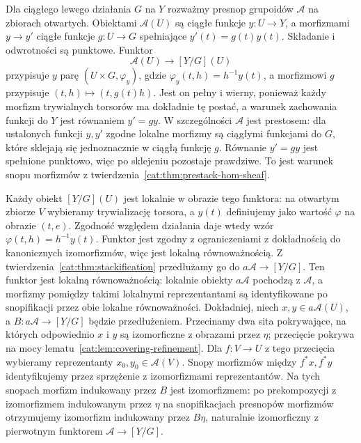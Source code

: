 \begin{przyklad}\label{cat:ex:quotient-stackification}
Dla ciągłego lewego działania $G$ na $Y$ rozważmy presnop grupoidów $\mathcal A$ na zbiorach otwartych. Obiektami $\mathcal A(U)$ są ciągłe funkcje $y:U\to Y$, a morfizmami $y\to y'$ ciągłe funkcje $g:U\to G$ spełniające $y'(t)=g(t)y(t)$. Składanie i odwrotności są punktowe. Funktor
\[
 \mathcal A(U)\longrightarrow [Y/G](U)
\]
przypisuje $y$ parę $(U\times G,\varphi_y)$, gdzie $\varphi_y(t,h)=h^{-1}y(t)$, a morfizmowi $g$ przypisuje $(t,h)\mapsto(t,g(t)h)$. Jest on pełny i wierny, ponieważ każdy morfizm trywialnych torsorów ma dokładnie tę postać, a warunek zachowania funkcji do $Y$ jest równaniem $y'=gy$. W szczególności $\mathcal A$ jest prestosem: dla ustalonych funkcji $y,y'$ zgodne lokalne morfizmy są ciągłymi funkcjami do $G$, które sklejają się jednoznacznie w ciągłą funkcję $g$. Równanie $y'=gy$ jest spełnione punktowo, więc po sklejeniu pozostaje prawdziwe. To jest warunek snopu morfizmów z twierdzenia~\ref{cat:thm:prestack-hom-sheaf}.

Każdy obiekt $[Y/G](U)$ jest lokalnie w obrazie tego funktora: na otwartym zbiorze $V$ wybieramy trywializację torsora, a $y(t)$ definiujemy jako wartość $\varphi$ na obrazie $(t,e)$. Zgodność względem działania daje wtedy wzór $\varphi(t,h)=h^{-1}y(t)$. Funktor jest zgodny z ograniczeniami z dokładnością do kanonicznych izomorfizmów, więc jest lokalną równoważnością. Z twierdzenia~\ref{cat:thm:stackification} przedłużamy go do $a\mathcal A\to[Y/G]$. Ten funktor jest lokalną równoważnością: lokalnie obiekty $a\mathcal A$ pochodzą z $\mathcal A$, a morfizmy pomiędzy takimi lokalnymi reprezentantami są identyfikowane po snopifikacji przez obie lokalne równoważności. Dokładniej, niech $x,y\in a\mathcal A(U)$, a $B:a\mathcal A\to[Y/G]$ będzie przedłużeniem. Przecinamy dwa sita pokrywające, na których odpowiednio $x$ i $y$ są izomorficzne z obrazami przez $\eta$; przecięcie pokrywa na mocy lematu~\ref{cat:lem:covering-refinement}. Dla $f:V\to U$ z tego przecięcia wybieramy reprezentanty $x_0,y_0\in\mathcal A(V)$. Snopy morfizmów między $f^*x,f^*y$ identyfikujemy przez sprzężenie z izomorfizmami reprezentantów. Na tych snopach morfizm indukowany przez $B$ jest izomorfizmem: po prekompozycji z izomorfizmem indukowanym przez $\eta$ na snopifikacjach presnopów morfizmów otrzymujemy izomorfizm indukowany przez $B\eta$, naturalnie izomorficzny z pierwotnym funktorem $\mathcal A\to[Y/G]$. 


\end{przyklad}
